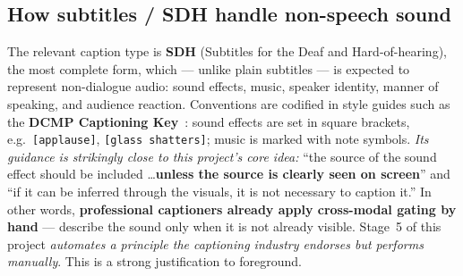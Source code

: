 \documentclass[11pt,a4paper]{article}
\begin{document}
\subsection{How subtitles / SDH handle non-speech sound}
The relevant caption type is \textbf{SDH} (Subtitles for the Deaf and Hard-of-hearing), the most
complete form, which --- unlike plain subtitles --- is expected to represent non-dialogue audio:
sound effects, music, speaker identity, manner of speaking, and audience reaction. Conventions are
codified in style guides such as the \textbf{DCMP Captioning Key}~\cite{dcmp}: sound effects are set
in square brackets, e.g.\ \texttt{[applause]}, \texttt{[glass shatters]}; music is marked with note
symbols. \emph{Its guidance is strikingly close to this project's core idea:} ``the source of the
sound effect should be included \dots \textbf{unless the source is clearly seen on screen}'' and
``if it can be inferred through the visuals, it is not necessary to caption it.'' In other words,
\textbf{professional captioners already apply cross-modal gating by hand} --- describe the sound only
when it is not already visible. Stage~5 of this project \emph{automates a principle the captioning
industry endorses but performs manually}. This is a strong justification to foreground.
\end{document}
